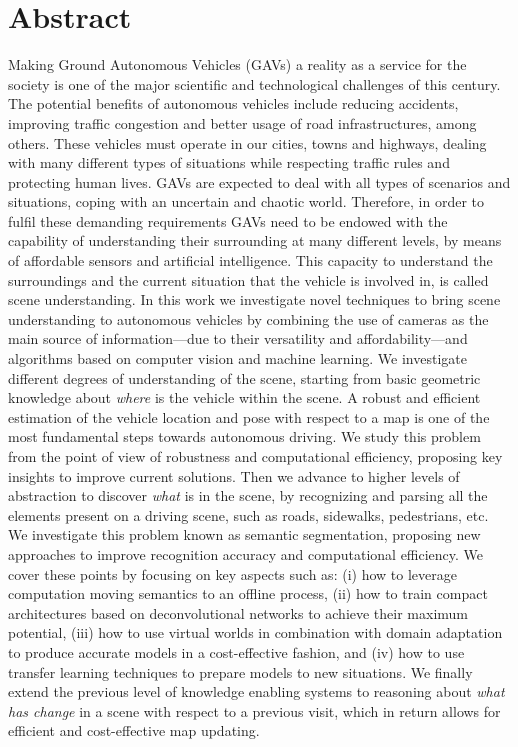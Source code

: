 


\chapter*{Abstract}

\vspace{-24mm}

Making Ground Autonomous Vehicles (GAVs) a reality as a service for the society is one of the major scientific and technological challenges of this century. The potential benefits of autonomous vehicles include reducing accidents, improving traffic congestion and better usage of road infrastructures, among others. These vehicles must operate in our cities, towns and highways, dealing with many different types of situations while respecting traffic rules and protecting human lives. GAVs are expected to deal with all types of scenarios and situations, coping with an uncertain and chaotic world. Therefore, in order to fulfil these demanding requirements GAVs need to be endowed with the capability of understanding their surrounding at many different levels, by means of affordable sensors and artificial intelligence. This capacity to understand the surroundings and the current situation that the vehicle is involved in, is called scene understanding. In this work we investigate novel techniques to bring scene understanding to autonomous vehicles by combining the use of cameras as the main source of information---due to their versatility and affordability---and algorithms based on computer vision and machine learning. We investigate different degrees of understanding of the scene, starting from basic geometric knowledge about \textit{where} is the vehicle within the scene. A robust and efficient estimation of the vehicle location and pose with respect to a map is one of the most fundamental steps towards autonomous driving. We study this problem from the point of view of robustness and computational efficiency, proposing key insights to improve current solutions. Then we advance to higher levels of abstraction to discover \textit{what} is in the scene, by recognizing and parsing all the elements present on a driving scene, such as roads, sidewalks, pedestrians, etc. We investigate this problem known as semantic segmentation, proposing new approaches to improve recognition accuracy and computational efficiency. We cover these points by focusing on key aspects such as: (i) how to leverage computation moving semantics to an offline process, (ii) how to train compact architectures based on deconvolutional networks to achieve their maximum potential, (iii) how to use virtual worlds in combination with domain adaptation to produce accurate models in a cost-effective fashion, and (iv) how to use transfer learning techniques to prepare models to new situations. We finally extend the previous level of knowledge enabling systems to reasoning about \textit{what has change} in a scene with respect to a previous visit, which in return allows for
efficient and cost-effective map updating.

